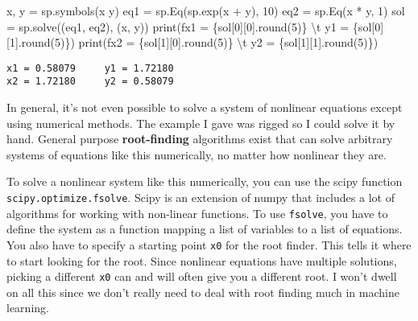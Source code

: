 \documentclass[
  letterpaper,
  DIV=11,
  numbers=noendperiod]{scrreprt}
\newenvironment{Shaded}{\begin{snugshade}}{\end{snugshade}}
\newcommand{\BuiltInTok}[1]{\textcolor[rgb]{0.00,0.23,0.31}{#1}}
\newcommand{\CharTok}[1]{\textcolor[rgb]{0.13,0.47,0.30}{#1}}
\newcommand{\DecValTok}[1]{\textcolor[rgb]{0.68,0.00,0.00}{#1}}
\newcommand{\NormalTok}[1]{\textcolor[rgb]{0.00,0.23,0.31}{#1}}
\newcommand{\OperatorTok}[1]{\textcolor[rgb]{0.37,0.37,0.37}{#1}}
\newcommand{\SpecialCharTok}[1]{\textcolor[rgb]{0.37,0.37,0.37}{#1}}
\newcommand{\SpecialStringTok}[1]{\textcolor[rgb]{0.13,0.47,0.30}{#1}}
\newcommand{\StringTok}[1]{\textcolor[rgb]{0.13,0.47,0.30}{#1}}
\begin{document}
\begin{Shaded}
\begin{Highlighting}[]
\NormalTok{x, y }\OperatorTok{=}\NormalTok{ sp.symbols(}\StringTok{\textquotesingle{}x y\textquotesingle{}}\NormalTok{)}
\NormalTok{eq1 }\OperatorTok{=}\NormalTok{ sp.Eq(sp.exp(x }\OperatorTok{+}\NormalTok{ y), }\DecValTok{10}\NormalTok{)}
\NormalTok{eq2 }\OperatorTok{=}\NormalTok{ sp.Eq(x }\OperatorTok{*}\NormalTok{ y, }\DecValTok{1}\NormalTok{)}
\NormalTok{sol }\OperatorTok{=}\NormalTok{ sp.solve((eq1, eq2), (x, y))}
\BuiltInTok{print}\NormalTok{(}\SpecialStringTok{f\textquotesingle{}x1 = }\SpecialCharTok{\{}\NormalTok{sol[}\DecValTok{0}\NormalTok{][}\DecValTok{0}\NormalTok{]}\SpecialCharTok{.}\BuiltInTok{round}\NormalTok{(}\DecValTok{5}\NormalTok{)}\SpecialCharTok{\}}\SpecialStringTok{ }\CharTok{\textbackslash{}t}\SpecialStringTok{ y1 = }\SpecialCharTok{\{}\NormalTok{sol[}\DecValTok{0}\NormalTok{][}\DecValTok{1}\NormalTok{]}\SpecialCharTok{.}\BuiltInTok{round}\NormalTok{(}\DecValTok{5}\NormalTok{)}\SpecialCharTok{\}}\SpecialStringTok{\textquotesingle{}}\NormalTok{)}
\BuiltInTok{print}\NormalTok{(}\SpecialStringTok{f\textquotesingle{}x2 = }\SpecialCharTok{\{}\NormalTok{sol[}\DecValTok{1}\NormalTok{][}\DecValTok{0}\NormalTok{]}\SpecialCharTok{.}\BuiltInTok{round}\NormalTok{(}\DecValTok{5}\NormalTok{)}\SpecialCharTok{\}}\SpecialStringTok{ }\CharTok{\textbackslash{}t}\SpecialStringTok{ y2 = }\SpecialCharTok{\{}\NormalTok{sol[}\DecValTok{1}\NormalTok{][}\DecValTok{1}\NormalTok{]}\SpecialCharTok{.}\BuiltInTok{round}\NormalTok{(}\DecValTok{5}\NormalTok{)}\SpecialCharTok{\}}\SpecialStringTok{\textquotesingle{}}\NormalTok{)}
\end{Highlighting}
\end{Shaded}

\begin{verbatim}
x1 = 0.58079     y1 = 1.72180
x2 = 1.72180     y2 = 0.58079
\end{verbatim}

In general, it's not even possible to solve a system of nonlinear
equations except using numerical methods. The example I gave was rigged
so I could solve it by hand. General purpose \textbf{root-finding}
algorithms exist that can solve arbitrary systems of equations like this
numerically, no matter how nonlinear they are.

To solve a nonlinear system like this numerically, you can use the scipy
function \texttt{scipy.optimize.fsolve}. Scipy is an extension of numpy
that includes a lot of algorithms for working with non-linear functions.
To use \texttt{fsolve}, you have to define the system as a function
mapping a list of variables to a list of equations. You also have to
specify a starting point \texttt{x0} for the root finder. This tells it
where to start looking for the root. Since nonlinear equations have
multiple solutions, picking a different \texttt{x0} can and will often
give you a different root. I won't dwell on all this since we don't
really need to deal with root finding much in machine learning.
\end{document}
